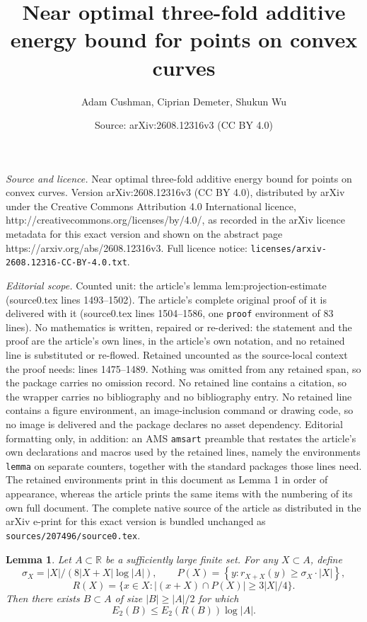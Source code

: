 \documentclass[10pt,a4paper]{amsart}
\title{Near optimal three-fold additive energy bound for points on convex curves}
\author{Adam Cushman, Ciprian Demeter, Shukun Wu}
\date{Source: arXiv:2608.12316v3 (CC BY 4.0)}
\newtheorem{lemma}{Lemma}
\begin{document}
\maketitle

\noindent\emph{Source and licence.} Near optimal three-fold additive energy bound for points on convex curves. Version arXiv:2608.12316v3 (CC BY 4.0), distributed by arXiv under the Creative Commons Attribution 4.0 International licence, http://creativecommons.org/licenses/by/4.0/, as recorded in the arXiv licence metadata for this exact version and shown on the abstract page https://arxiv.org/abs/2608.12316v3. Full licence notice: \texttt{licenses/arxiv-2608.12316-CC-BY-4.0.txt}.\par\smallskip

\noindent\textit{Editorial scope.} Counted unit: the article's lemma lem:projection-estimate (source0.tex lines 1493--1502). The article's complete original proof of it is delivered with it (source0.tex lines 1504--1586, one \texttt{proof} environment of 83 lines). No mathematics is written, repaired or re-derived: the statement and the proof are the article's own lines, in the article's own notation, and no retained line is substituted or re-flowed.  Retained uncounted as the source-local context the proof needs: lines 1475--1489.  Nothing was omitted from any retained span, so the package carries no omission record.  No retained line contains a citation, so the wrapper carries no bibliography and no bibliography entry.  No retained line contains a figure environment, an image-inclusion command or drawing code, so no image is delivered and the package declares no asset dependency.  Editorial formatting only, in addition: an AMS \texttt{amsart} preamble that restates the article's own declarations and macros used by the retained lines, namely the environments \texttt{lemma} on separate counters, together with the standard packages those lines need.  The retained environments print in this document as Lemma 1 in order of appearance, whereas the article prints the same items with the numbering of its own full document.  The complete native source of the article as distributed in the arXiv e-print for this exact version is bundled unchanged as \texttt{sources/207496/source0.tex}.
\begin{lemma}
    \label{lem:rudnev-stevens-input}
    Let \(A \subset \mathbb{R} \) be a sufficiently large finite set. 
    For any \(X \subset A\), define
    \[
    \sigma_X = |X| / (8 |X+X| \log|A|) , \qquad P(X) = \left\{ y  : r_{X+X} (y) \geq \sigma _X \cdot |X| \right\}, 
    \]
    \[
    R(X) = \{x \in X : \left\lvert (x + X)\cap P(X) \right\rvert \geq 3 |X| /4  \}
    .\]
    Then there exists \(B \subset A \) of size \(\left\lvert B \right\rvert \geq \left\lvert A \right\rvert  / 2\) for which
    \[
    E_2(B) \leq E_2(R(B)) \log \left\lvert A \right\rvert 
    .\]
\end{lemma}
\end{document}
